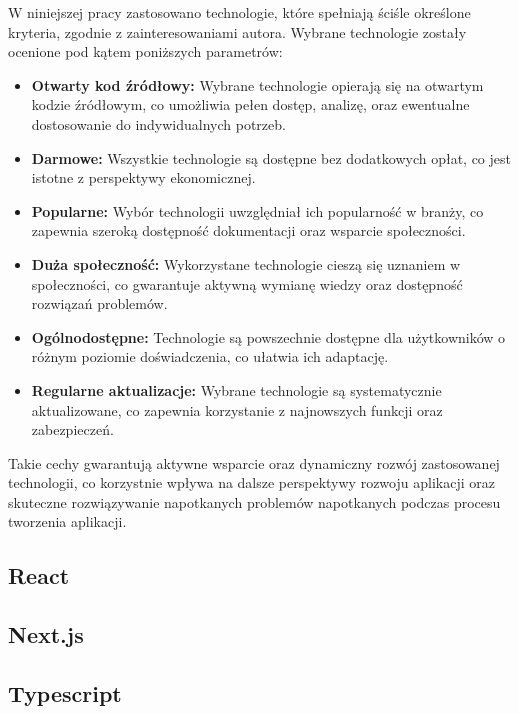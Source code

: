 W niniejszej pracy zastosowano technologie, które spełniają ściśle określone kryteria, zgodnie z zainteresowaniami autora. Wybrane technologie zostały ocenione pod kątem poniższych parametrów:

\begin{itemize}
    \item \textbf{Otwarty kod źródłowy:} Wybrane technologie opierają się na otwartym kodzie źródłowym, co umożliwia pełen dostęp, analizę, oraz ewentualne dostosowanie do indywidualnych potrzeb.
    
    \item \textbf{Darmowe:} Wszystkie technologie są dostępne bez dodatkowych opłat, co jest istotne z perspektywy ekonomicznej.
    
    \item \textbf{Popularne:} Wybór technologii uwzględniał ich popularność w branży, co zapewnia szeroką dostępność dokumentacji oraz wsparcie społeczności.
    
    \item \textbf{Duża społeczność:} Wykorzystane technologie cieszą się uznaniem w społeczności, co gwarantuje aktywną wymianę wiedzy oraz dostępność rozwiązań problemów.
    
    \item \textbf{Ogólnodostępne:} Technologie są powszechnie dostępne dla użytkowników o różnym poziomie doświadczenia, co ułatwia ich adaptację.
    
    \item \textbf{Regularne aktualizacje:} Wybrane technologie są systematycznie aktualizowane, co zapewnia korzystanie z najnowszych funkcji oraz zabezpieczeń.
\end{itemize}

Takie cechy gwarantują aktywne wsparcie oraz dynamiczny rozwój zastosowanej technologii, co korzystnie wpływa na dalsze perspektywy rozwoju aplikacji oraz skuteczne rozwiązywanie napotkanych problemów napotkanych podczas procesu tworzenia aplikacji.

\subsection{React}

\subsection{Next.js}

\subsection{Typescript}

